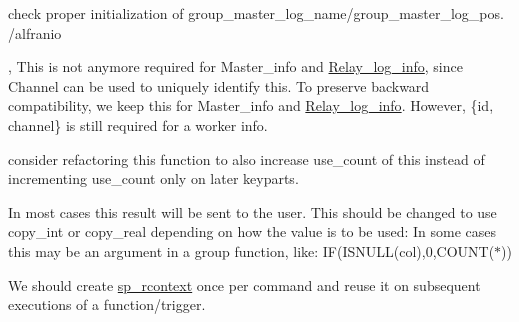\begin{DoxyRefList}
\item[\label{todo__todo000063}%
\Hypertarget{todo__todo000063}%
Member \mbox{\hyperlink{classRelay__log__info_aec9eae2f70577d73ee930cd8223f5233}{Relay\+\_\+log\+\_\+info\+:\+:init\+\_\+relay\+\_\+log\+\_\+pos}} (const char $\ast$log, ulonglong pos, bool need\+\_\+data\+\_\+lock, const char $\ast$$\ast$errmsg, bool keep\+\_\+looking\+\_\+for\+\_\+fd)]check proper initialization of group\+\_\+master\+\_\+log\+\_\+name/group\+\_\+master\+\_\+log\+\_\+pos. /alfranio 
\item[\label{todo__todo000061}%
\Hypertarget{todo__todo000061}%
Member \mbox{\hyperlink{classRpl__info_a409b8a0921617ffd71e40977be694eef}{Rpl\+\_\+info\+:\+:internal\+\_\+id}} ], This is not anymore required for Master\+\_\+info and \mbox{\hyperlink{classRelay__log__info}{Relay\+\_\+log\+\_\+info}}, since Channel can be used to uniquely identify this. To preserve backward compatibility, we keep this for Master\+\_\+info and \mbox{\hyperlink{classRelay__log__info}{Relay\+\_\+log\+\_\+info}}. However, \{id, channel\} is still required for a worker info.  
\item[\label{todo__todo000056}%
\Hypertarget{todo__todo000056}%
Member \mbox{\hyperlink{classSEL__ARG_a35b87fe0aad5b3832782d51cf9e6d79a}{S\+E\+L\+\_\+\+A\+RG\+:\+:increment\+\_\+use\+\_\+count}} (long count)]consider refactoring this function to also increase use\+\_\+count of \textquotesingle{}this\textquotesingle{} instead of incrementing use\+\_\+count only on later keyparts.  
\item[\label{todo__todo000082}%
\Hypertarget{todo__todo000082}%
Member \mbox{\hyperlink{group__Query__Executor_gaea6e7f59b9cca648046cf55fe5a95732}{setup\+\_\+copy\+\_\+fields}} (T\+HD $\ast$thd, Temp\+\_\+table\+\_\+param $\ast$param, Ref\+\_\+ptr\+\_\+array ref\+\_\+pointer\+\_\+array, \mbox{\hyperlink{classList}{List$<$ Item $>$}} \&res\+\_\+selected\+\_\+fields, \mbox{\hyperlink{classList}{List$<$ Item $>$}} \&res\+\_\+all\+\_\+fields, uint elements, \mbox{\hyperlink{classList}{List$<$ Item $>$}} \&all\+\_\+fields)]In most cases this result will be sent to the user. This should be changed to use copy\+\_\+int or copy\+\_\+real depending on how the value is to be used\+: In some cases this may be an argument in a group function, like\+: IF(I\+S\+N\+U\+L\+L(col),0,C\+O\+U\+N\+T($\ast$)) 
\item[\label{todo__todo000069}%
\Hypertarget{todo__todo000069}%
Member \mbox{\hyperlink{classsp__head_a1c125eeeef415da5d45fdf16de43ecb7}{sp\+\_\+head\+:\+:execute\+\_\+function}} (T\+HD $\ast$thd, \mbox{\hyperlink{classItem}{Item}} $\ast$$\ast$args, uint argcount, \mbox{\hyperlink{classField}{Field}} $\ast$return\+\_\+fld)]We should create \mbox{\hyperlink{classsp__rcontext}{sp\+\_\+rcontext}} once per command and reuse it on subsequent executions of a function/trigger.


\end{DoxyRefList}
